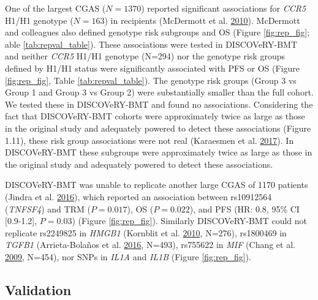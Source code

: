 \documentclass[]{DissertateOSU}
\begin{document}
One of the largest CGAS (\(N=1370\)) reported significant associations
for \emph{CCR5} H1/H1 genotype (\(N=163\)) in recipients (McDermott et
al. \protect\hyperlink{ref-mcdermott2010}{2010}). McDermott and
colleagues also defined genotype risk subgroups and OS (Figure
\ref{fig:rep_fig}; able \ref{tab:repval_table}). These associations were
tested in DISCOVeRY-BMT and neither \emph{CCR5} H1/H1 genotype (N=294)
nor the genotype risk groups defined by H1/H1 status were significantly
associated with PFS or OS (Figure \ref{fig:rep_fig}, Table
\ref{tab:repval_table}). The genotype risk groups (Group 3 vs Group 1
and Group 3 vs Group 2) were substantially smaller than the full cohort.
We tested these in DISCOVeRY-BMT and found no associations. Considering
the fact that DISCOVeRY-BMT cohorts were approximately twice as large as
those in the original study and adequately powered to detect these
associations (Figure 1.11), these risk group associations were not real
(Karaesmen et al. \protect\hyperlink{ref-Karaesmen_2017}{2017}). In
DISCOVeRY-BMT these subgroups were approximately twice as large as those
in the original study and adequately powered to detect these
associations.

DISCOVeRY-BMT was unable to replicate another large CGAS of 1170
patients (Jindra et al. \protect\hyperlink{ref-jindra_2016}{2016}),
which reported an association between rs10912564 (\emph{TNFSF4}) and TRM
(\(P=0.017\)), OS (\(P=0.022\)), and PFS (HR: 0.8, 95\% CI
{[}0.9-1.2{]}, \(P=0.03\)) (Figure \ref{fig:rep_fig}). Similarly
DISCOVeRY-BMT could not replicate rs2249825 in \emph{HMGB1} (Kornblit et
al. \protect\hyperlink{ref-kornblit_2010}{2010}, N=276), rs1800469 in
\emph{TGFB1} (Arrieta-Bolaños et al.
\protect\hyperlink{ref-bolanos_2016}{2016}, N=493), rs755622 in
\emph{MIF} (Chang et al. \protect\hyperlink{ref-chang_2009}{2009},
N=454), nor SNPs in \emph{IL1A} and \emph{IL1B} (Figure
\ref{fig:rep_fig}).

\subsection{Validation}\label{validation}
\end{document}
